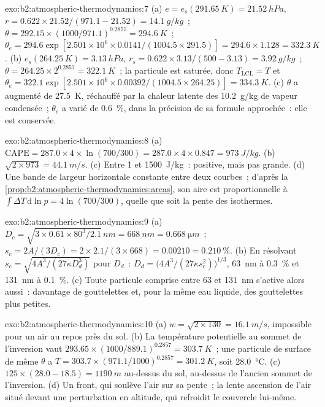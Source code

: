 \begin{solution}{exo:b2:atmospheric-thermodynamics:7}
(a) $e = e_s(\qty{291.65}{K}) = \qty{21.52}{hPa}$, $r = 0.622 \times 21.52/(971.1 - 21.52) =
\qty{14.1}{g/kg}$~; $\theta = 292.15 \times (1000/971.1)^{0.2857} = \qty{294.6}{K}$~; $\theta_e =
294.6 \exp[2.501 \times 10^6 \times 0.0141/(1004.5 \times 291.5)] = 294.6 \times 1.128 =
\qty{332.3}{K}$. (b) $e_s(\qty{264.25}{K}) = \qty{3.13}{hPa}$, $r_s = 0.622 \times 3.13/(500 -
3.13) = \qty{3.92}{g/kg}$~; $\theta = 264.25 \times 2^{0.2857} = \qty{322.1}{K}$~; la particule
est saturée, donc $T_{\text{LCL}} = T$ et $\theta_e = 322.1 \exp[2.501 \times 10^6 \times
0.00392/(1004.5 \times 264.25)] = \qty{334.3}{K}$. (c) $\theta$ a augmenté de \qty{27.5}{K},
réchauffé par la chaleur latente des \qty{10.2}{g/kg} de vapeur condensée~; $\theta_e$ a
varié de \qty{0.6}{\percent}, dans la précision de sa formule approchée~: elle est conservée.
\end{solution}

\begin{solution}{exo:b2:atmospheric-thermodynamics:8}
(a) $\text{CAPE} = 287.0 \times 4 \times \ln(700/300) = 287.0 \times 4 \times 0.847 =
\qty{973}{J/kg}$. (b) $\sqrt{2 \times 973} = \qty{44.1}{m/s}$. (c) Entre 1 et \qty{1500}{J/kg}~:
positive, mais pas grande. (d) Une bande de largeur horizontale constante entre deux courbes~;
d'après la \cref{prop:b2:atmospheric-thermodynamics:areas}, son aire est proportionnelle à $\int
\Delta T\,\mathrm{d}\ln p = 4 \ln(700/300)$, quelle que soit la pente des isothermes.
\end{solution}

\begin{solution}{exo:b2:atmospheric-thermodynamics:9}
(a) $D_c = \sqrt{3 \times 0.61 \times 80^3/2.1}\,\unit{nm} = \qty{668}{nm} =
\qty{0.668}{\micro m}$~; $s_c = 2A/(3D_c) = 2 \times 2.1/(3 \times 668) = 0.00210 =
\qty{0.210}{\percent}$. (b) En résolvant $s_c = \sqrt{4A^3/(27\kappa D_d^3)}$ pour $D_d$~: $D_d =
\bigl(4A^3/(27\kappa s_c^2)\bigr)^{1/3}$, \qty{63}{nm} à \qty{0.3}{\percent} et \qty{131}{nm}
à \qty{0.1}{\percent}. (c) Toute particule comprise entre 63 et \qty{131}{nm} s'active alors
aussi~: davantage de gouttelettes et, pour la même eau liquide, des gouttelettes plus petites.
\end{solution}

\begin{solution}{exo:b2:atmospheric-thermodynamics:10}
(a) $w = \sqrt{2 \times 130} = \qty{16.1}{m/s}$, impossible pour un air au repos près du sol. (b)
La température potentielle au sommet de l'inversion vaut $293.65 \times (1000/889.1)^{0.2857} =
\qty{303.7}{K}$~; une particule de surface de même $\theta$ a $T = 303.7 \times (971.1/1000)^{0.2857}
= \qty{301.2}{K}$, soit \qty{28.0}{\celsius}. (c) $125 \times (28.0 - 18.5) = \qty{1190}{m}$ au-dessus
du sol, au-dessus de l'ancien sommet de l'inversion. (d) Un front, qui soulève l'air sur sa pente~; la
lente ascension de l'air situé devant une perturbation en altitude, qui refroidit le couvercle lui-même.
\end{solution}

